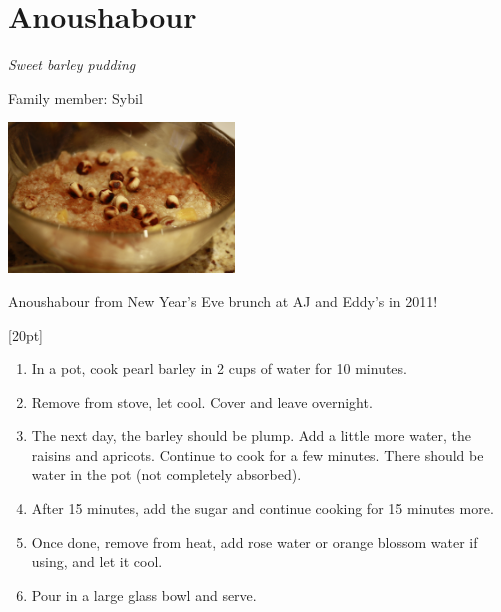 \chapter{Anoushabour}
\label{ch:anoushabour}
\textit{Sweet barley pudding}

Family member: Sybil


\begin{marginfigure}[20pt]
  \includegraphics[width=60mm]{dermardiros/images/Anoushabour.JPG}
    \caption{Anoushabour from New Year's Eve brunch at AJ and Eddy's in 2011!}
\end{marginfigure}[20pt]


\begin{enumerate}
    \item In a pot, cook pearl barley in 2 cups of water for 10 minutes.
    \item Remove from stove, let cool. Cover and leave overnight.
    \item The next day, the barley should be plump. Add a little more water, the raisins and apricots. Continue to cook for a few minutes. There should be water in the pot (not completely absorbed).
    \item After 15 minutes, add the sugar and continue cooking for 15 minutes more.
    \item Once done, remove from heat, add rose water or orange blossom water if using, and let it cool.
    \item Pour in a large glass bowl and serve.
\end{enumerate}